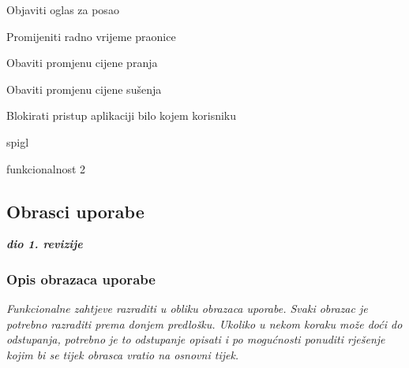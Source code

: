 \begin{packed_enum}
\begin{packed_enum}
					\item Objaviti oglas za posao
					\item Promijeniti radno vrijeme praonice
					\item Obaviti promjenu cijene pranja
					\item Obaviti promjenu cijene sušenja
					\item Blokirati pristup aplikaciji bilo kojem korisniku
					
				\end{packed_enum}
			
				\item  {}
				
				\begin{packed_enum}
					
					\item spigl
					\item funkcionalnost 2
					
				\end{packed_enum}
			
			\end{packed_enum}
			
			\eject 
			
			
				
			\subsection{Obrasci uporabe}
				
				\textbf{\textit{dio 1. revizije}}
				
				\subsubsection{Opis obrazaca uporabe}
					\textit{Funkcionalne zahtjeve razraditi u obliku obrazaca uporabe. Svaki obrazac je potrebno razraditi prema donjem predlošku. Ukoliko u nekom koraku može doći do odstupanja, potrebno je to odstupanje opisati i po mogućnosti ponuditi rješenje kojim bi se tijek obrasca vratio na osnovni tijek.}\\
					

